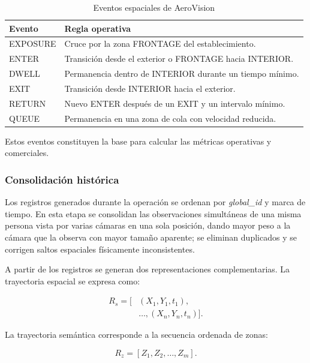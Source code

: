 \documentclass[12pt,letterpaper]{article}
\begin{document}
\begin{table}[H]
\caption{Eventos espaciales de AeroVision}
\label{tab:spatial_events}
\centering
\footnotesize
\begin{tabular}{p{}p{}}
\hline
\textbf{Evento} & \textbf{Regla operativa} \\
\hline
EXPOSURE & Cruce por la zona FRONTAGE del establecimiento. \\
ENTER & Transición desde el exterior o FRONTAGE hacia INTERIOR. \\
DWELL & Permanencia dentro de INTERIOR durante un tiempo mínimo. \\
EXIT & Transición desde INTERIOR hacia el exterior. \\
RETURN & Nuevo ENTER después de un EXIT y un intervalo mínimo. \\
QUEUE & Permanencia en una zona de cola con velocidad reducida. \\
\hline
\end{tabular}
\end{table}

Estos eventos constituyen la base para calcular las métricas operativas
y comerciales.

\subsubsection{Consolidación histórica}

Los registros generados durante la operación se ordenan por
\textit{global\_id} y marca de tiempo. En esta etapa se consolidan las
observaciones simultáneas de una misma persona vista por varias cámaras
en una sola posición, dando mayor peso a la cámara que la observa con
mayor tamaño aparente; se eliminan duplicados y se corrigen saltos
espaciales físicamente inconsistentes.

A partir de los registros se generan dos representaciones
complementarias. La trayectoria espacial se expresa como:

\begin{equation}
\begin{aligned}
R_s=[
&(X_1,Y_1,t_1),\\
&\ldots,(X_n,Y_n,t_n)].
\end{aligned}
\end{equation}

La trayectoria semántica corresponde a la secuencia ordenada de zonas:

\begin{equation}
R_z=[Z_1,Z_2,\ldots,Z_m].
\end{equation}
\end{document}
